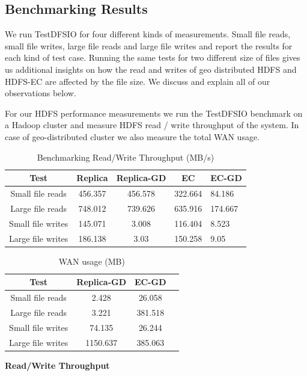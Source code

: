 \documentclass{sig-alternate-05-2015}
\begin{document}
\subsection{Benchmarking Results}
We run TestDFSIO for four different kinds of measurements. Small file reads, small file writes, large file reads and large file writes and report the results for each kind of test case. Running the same tests for two different size of  files gives us additional insights on how the read and writes of geo distributed HDFS and HDFS-EC are affected by the file size. We discuss and explain all of our observations below. 

For our HDFS performance measurements we run the TestDFSIO benchmark on a Hadoop cluster and measure HDFS read / write throughput of the system. In case of geo-distributed cluster we also measure the total WAN usage. 

\begin{table}
\centering
\caption{Benchmarking Read/Write Throughput (MB/s)}
\label{tput:table}
\begin{tabular}{|c|c|c|c|l|} \hline
Test&Replica&Replica-GD&EC&EC-GD\\ \hline
Small file reads&456.357&456.578&322.664&84.186\\ \hline
Large file reads&748.012&739.626&635.916&174.667\\ \hline
Small file writes&145.071&3.008&116.404&8.523\\ \hline
Large file writes&186.138&3.03&150.258 & 9.05 \\

\hline\end{tabular}
\end{table}
\begin{table}
\centering

\begin{tabular}{|c|c|c|l|} \hline
Test&Replica-GD&EC-GD\\ \hline
Small file reads&2.428&26.058\\ \hline
Large file reads&3.221&381.518\\ \hline
Small file writes&74.135&26.244\\ \hline
Large file writes&1150.637&385.063 \\

\hline\end{tabular}
\caption{WAN usage (MB)}
\label{wan:table}
\end{table}

\textbf{Read/Write Throughput} \\
\end{document}

